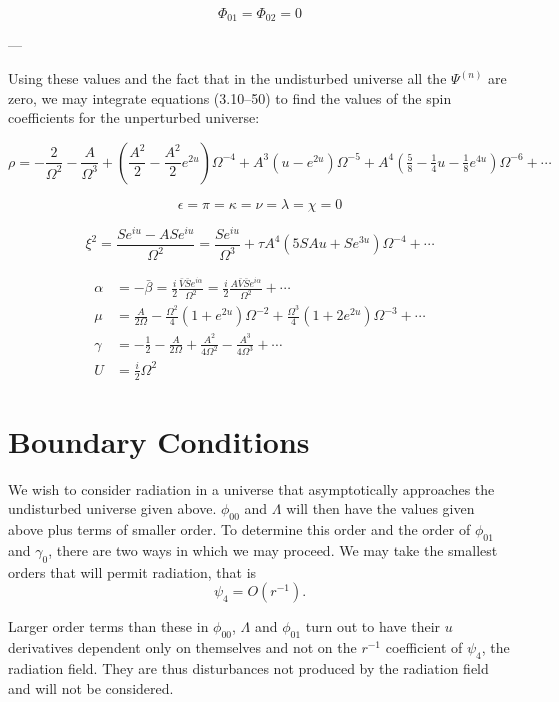 \[
\Phi_{01} = \Phi_{02} = 0
\tag{4.11}
\]

---

Using these values and the fact that in the undisturbed universe all the $\Psi^{(n)}$ are zero,  
we may integrate equations (3.10–50) to find the values of the spin coefficients for the unperturbed universe:

\[
\rho = -\frac{2}{\Omega^{2}} - \frac{A}{\Omega^{3}} 
+ \left( \frac{A^{2}}{2} - \frac{A^{2}}{2} e^{2u} \right) \Omega^{-4}
+ A^{3} (u - e^{2u}) \Omega^{-5} 
+ A^{4} \left( \tfrac{5}{8} - \tfrac{1}{4}u - \tfrac{1}{8} e^{4u} \right) \Omega^{-6} + \cdots
\]

\[
\epsilon = \pi = \kappa = \nu = \lambda = \chi = 0
\]

\[
\xi^{2} = \frac{S e^{iu} - A S e^{iu}}{\Omega^{2}} 
= \frac{S e^{iu}}{\Omega^{3}} 
+ \tau A^{4} (5 S A u + S e^{3u}) \Omega^{-4} + \cdots
\]



\begin{align}
\alpha
&= -\bar{\beta}
 = \frac{i}{2}\frac{\bar{V}\bar{S}e^{i\alpha}}{\Omega^{2}}
 = \frac{i}{2}\frac{A\bar{V}\bar{S}e^{i\alpha}}{\Omega^{2}}
 + \cdots
\\[4pt]
\mu
&= \frac{A}{2\Omega}
 - \frac{\Omega^{2}}{4}\left(1+e^{2u}\right)\Omega^{-2}
 + \frac{\Omega^{3}}{4}\left(1+2e^{2u}\right)\Omega^{-3}
 + \cdots
\\[4pt]
\gamma
&= -\frac{1}{2}
 - \frac{A}{2\Omega}
 + \frac{A^{2}}{4\Omega^{2}}
 - \frac{A^{3}}{4\Omega^{3}}
 + \cdots
\\[4pt]
U
&= \frac{i}{2}\Omega^{2}
\tag{4.12}
\end{align}

\section{Boundary Conditions}

We wish to consider radiation in a universe that
asymptotically approaches the undisturbed universe given
above. $\phi_{00}$ and $\Lambda$ will then have the values
given above plus terms of smaller order. To determine this
order and the order of $\phi_{01}$ and $\gamma_0$, there are two
ways in which we may proceed. We may take the smallest orders
that will permit radiation, that is
\[
    \psi_4 = O(r^{-1}).
\]

Larger order terms than these in $\phi_{00}$, $\Lambda$ and
$\phi_{01}$ turn out to have their $u$ derivatives
dependent only on themselves and not on the $r^{-1}$ coefficient
of $\psi_4$, the radiation field. They are thus disturbances
not produced by the radiation field and will not be considered.


